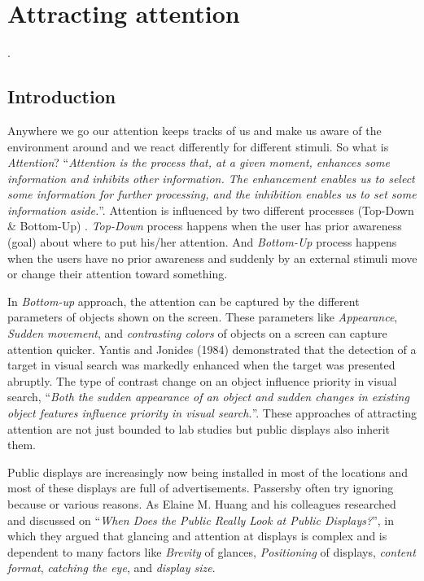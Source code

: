 
\chapter{Attracting attention} %


\label{Chapter3} %
\newpage
.
\newpage

\section{Introduction}

Anywhere we go our attention keeps tracks of us and make us aware of the environment around and we react differently for different stimuli. So what is \emph{Attention}? ``\emph{Attention is the process that, at a given moment, enhances some information and inhibits other information. The enhancement enables us to select some information for further processing, and the inhibition enables us to set some information aside.}''\cite{Attention}. Attention is influenced by two different processes (Top-Down \& Bottom-Up) \cite{attention1,Attention}. \emph{Top-Down} process happens when the user has prior awareness (goal) about where to put his/her attention. And \emph{Bottom-Up} process happens when the users have no prior awareness and suddenly by an external stimuli move or change their attention toward something. 

In \emph{Bottom-up} approach, the attention can be captured by the different parameters of objects shown on the screen. These parameters like \emph{Appearance}, \emph{Sudden movement}, and \emph{contrasting colors} of objects on a screen can capture attention quicker. Yantis and Jonides (1984) demonstrated that the detection of a target in visual search was markedly enhanced when the target was presented abruptly\cite{capturingattention}. The type of contrast change on an object influence priority in visual search, ``\emph{Both the sudden appearance of an object and sudden changes in existing object features influence priority in visual search.}''\cite{Luminance}. These approaches of attracting attention are not just bounded to lab studies but public displays also inherit them. 

Public displays are increasingly now being installed in most of the locations and most of these displays are full of advertisements. Passersby often try ignoring because or various reasons. As Elaine M. Huang and his colleagues researched and discussed on ``\emph{When Does the Public Really Look at Public Displays?}''\cite{WhenPublicDisplays}, in which they argued that glancing and attention at displays is complex and is dependent to many factors like \emph{Brevity} of glances, \emph{Positioning} of displays, \emph{content format}, \emph{catching the eye}, and \emph{display size}. 

